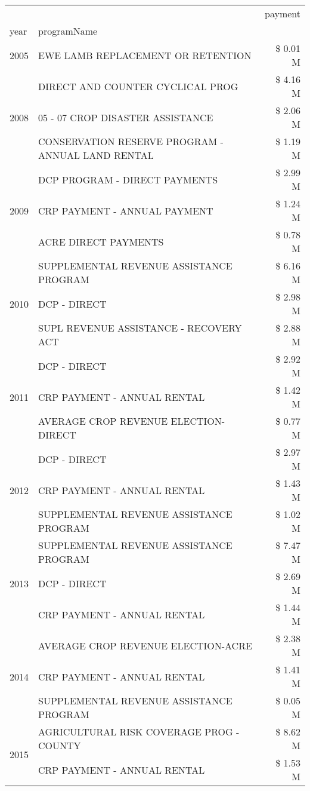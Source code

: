 \begin{tabular}{llr}
\toprule
 &  & payment \\
year & programName &  \\
\midrule
2005 & EWE LAMB REPLACEMENT OR RETENTION & \$ 0.01 M \\
\cline{1-3}
\multirow[t]{3}{*}{2008} & DIRECT AND COUNTER CYCLICAL PROG & \$ 4.16 M \\
 & 05 - 07 CROP DISASTER ASSISTANCE & \$ 2.06 M \\
 & CONSERVATION RESERVE PROGRAM - ANNUAL LAND RENTAL & \$ 1.19 M \\
\cline{1-3}
\multirow[t]{3}{*}{2009} & DCP PROGRAM - DIRECT PAYMENTS & \$ 2.99 M \\
 & CRP PAYMENT - ANNUAL PAYMENT & \$ 1.24 M \\
 & ACRE DIRECT PAYMENTS & \$ 0.78 M \\
\cline{1-3}
\multirow[t]{3}{*}{2010} & SUPPLEMENTAL REVENUE ASSISTANCE PROGRAM & \$ 6.16 M \\
 & DCP - DIRECT & \$ 2.98 M \\
 & SUPL REVENUE ASSISTANCE - RECOVERY ACT & \$ 2.88 M \\
\cline{1-3}
\multirow[t]{3}{*}{2011} & DCP - DIRECT & \$ 2.92 M \\
 & CRP PAYMENT - ANNUAL RENTAL & \$ 1.42 M \\
 & AVERAGE CROP REVENUE ELECTION-DIRECT & \$ 0.77 M \\
\cline{1-3}
\multirow[t]{3}{*}{2012} & DCP - DIRECT & \$ 2.97 M \\
 & CRP PAYMENT - ANNUAL RENTAL & \$ 1.43 M \\
 & SUPPLEMENTAL REVENUE ASSISTANCE PROGRAM & \$ 1.02 M \\
\cline{1-3}
\multirow[t]{3}{*}{2013} & SUPPLEMENTAL REVENUE ASSISTANCE PROGRAM & \$ 7.47 M \\
 & DCP - DIRECT & \$ 2.69 M \\
 & CRP PAYMENT - ANNUAL RENTAL & \$ 1.44 M \\
\cline{1-3}
\multirow[t]{3}{*}{2014} & AVERAGE CROP REVENUE ELECTION-ACRE & \$ 2.38 M \\
 & CRP PAYMENT - ANNUAL RENTAL & \$ 1.41 M \\
 & SUPPLEMENTAL REVENUE ASSISTANCE PROGRAM & \$ 0.05 M \\
\cline{1-3}
\multirow[t]{3}{*}{2015} & AGRICULTURAL RISK COVERAGE PROG - COUNTY & \$ 8.62 M \\
 & CRP PAYMENT - ANNUAL RENTAL & \$ 1.53 M \\

\end{tabular}
